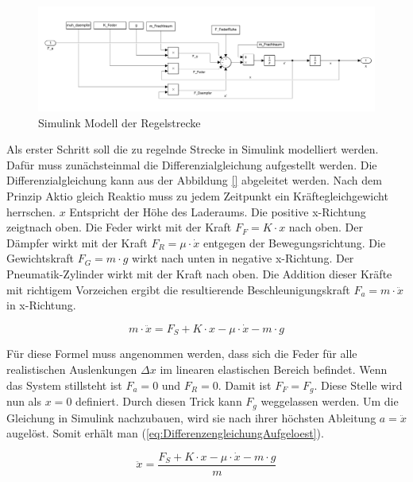 	\begin{figure}[hbt] 
		\centering
		   \includegraphics[width=1.0\textwidth]{Bilder/SimulinkStreckenModell.PNG}
		\caption{Simulink Modell der Regelstrecke}
		\label{SimulinkStreckenModell}
	\end{figure}

	Als erster Schritt soll die zu regelnde Strecke in Simulink modelliert werden. Dafür muss zunächsteinmal die Differenzialgleichung aufgestellt werden.
	Die Differenzialgleichung kann aus der Abbildung \ref{} abgeleitet werden. 
	Nach dem Prinzip Aktio gleich Reaktio muss zu jedem Zeitpunkt ein Kräftegleichgewicht herrschen.
	$x$ Entspricht der Höhe des Laderaums. Die positive x-Richtung zeigtnach oben. Die Feder wirkt mit der Kraft $F_{F} = K \cdot x$ nach oben. Der Dämpfer wirkt mit der Kraft 
	$F_{R} = \mu \cdot \dot{x}$ entgegen der Bewegungsrichtung. Die Gewichtskraft $F_{G} = m \cdot g $ wirkt nach unten in negative x-Richtung. Der Pneumatik-Zylinder 
	wirkt mit der Kraft  nach oben. Die Addition dieser Kräfte mit richtigem Vorzeichen ergibt die resultierende Beschleunigungskraft $F_{a} = m \cdot \ddot{x}$
	in x-Richtung.

	\begin{equation}
		m \cdot \ddot{x} = F_{S} + K \cdot x - \mu \cdot \dot{x} - m \cdot g
		\label{eq:Differenzengleichung}
	\end{equation}

	Für diese Formel muss angenommen werden, dass sich die Feder für alle realistischen Auslenkungen $\Delta x$ im linearen elastischen Bereich befindet. Wenn das System stillsteht ist $F_{a} = 0$ 
	und $F_{R} = 0$. Damit ist $F_{F} = F_{g}$. Diese Stelle wird nun als $x = 0$ definiert. Durch diesen Trick kann $F_{g}$ weggelassen werden. 
	Um die Gleichung in Simulink nachzubauen, wird sie nach ihrer höchsten Ableitung $a = \ddot{x}$ augelöst. Somit erhält man (\ref{eq:DifferenzengleichungAufgeloest}).

	\begin{equation}
		\ddot{x} = \frac{F_{S} + K \cdot x - \mu \cdot \dot{x} - m \cdot g}{m}
		\label{eq:DifferenzengleichungAufgeloest}
	\end{equation}

